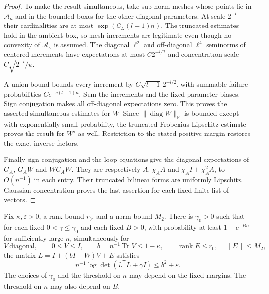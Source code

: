 \begin{proof}
To make the result simultaneous, take sup-norm meshes whose points lie
in $\mathcal A_\kappa$ and in the bounded boxes for the other diagonal
parameters.  At scale $2^{-l}$ their cardinalities are at most
$\exp(C_L(l+1)n)$.  The truncated estimates hold in the ambient box,
so mesh increments are legitimate even though no convexity of
$\mathcal A_\kappa$ is assumed.  The diagonal $\ell^2$ and off-diagonal
$\ell^4$ seminorms of centered increments have expectations at most
$C2^{-l/2}$ and concentration scale $C\sqrt{2^{-l}/n}$.

A union bound bounds every increment by
$C\sqrt{l+1}\,2^{-l/2}$, with summable failure probabilities
$Ce^{-c(l+1)n}$.  Sum the increments and the fixed-parameter biases.
Sign conjugation makes all off-diagonal expectations zero.
This proves the asserted simultaneous estimates for $W$.
Since $\|\operatorname{diag}W\|_{\mathrm F}$ is bounded except with
exponentially small probability, the truncated Frobenius Lipschitz
estimate proves the result for $W^\circ$ as well.  Restriction to the
stated positive margin restores the exact inverse factors.

Finally sign conjugation and the loop equations give the diagonal
expectations of $G_A$, $G_AW$ and $WG_AW$. They are respectively $A$,
$\chi_AA$ and $\chi_AI+\chi_A^2A$, to $O(n^{-1})$ in each entry.  Their truncated
bilinear forms are uniformly Lipschitz.  Gaussian concentration proves
the last assertion for each fixed finite list of vectors.
\end{proof}

\begin{lemma}\label{prof:endpoint-logdet}
Fix $\kappa,\varepsilon>0$, a rank bound $r_0$, and a norm bound $M_2$.
There is $\gamma_0>0$ such that for each fixed
$0<\gamma\le\gamma_0$ and each fixed $B>0$, with probability at least
$1-e^{-Bn}$ for sufficiently large $n$, simultaneously for
\[
 V\ \text{diagonal},\qquad 0\le V\le I,\qquad
 b=n^{-1}\operatorname{Tr}V\le1-\kappa,
 \qquad \operatorname{rank}E\le r_0,\quad\|E\|\le M_2,
\]
the matrix $L=I+(bI-W)V+E$ satisfies
\[
 n^{-1}\log\det(L^{\mathsf T}L+\gamma I)\le b^2+\varepsilon.
\]
The choices of $\gamma_0$ and the threshold on $n$ may depend on the
fixed margins.  The threshold on $n$ may also depend on $B$.
\end{lemma}

